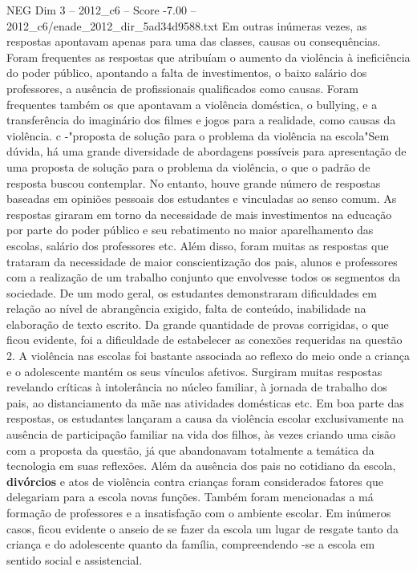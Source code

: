 \begin{textsample}{NEG Dim 3 – 2012\_c6 – Score -7.00 – 2012\_c6/enade\_2012\_dir\_5ad34d9588.txt}
Em outras inúmeras vezes, as respostas apontavam apenas para uma das classes, causas ou consequências.
Foram frequentes as respostas que atribuíam o aumento da violência à ineficiência do poder público, apontando a falta de investimentos, o baixo salário dos professores, a ausência de profissionais qualificados como causas.
Foram frequentes também os que apontavam a violência doméstica, o bullying, e a transferência do imaginário dos filmes e jogos para a realidade, como causas da violência. c -"proposta de solução para o problema da violência na escola"Sem dúvida, há uma grande diversidade de abordagens possíveis para apresentação de uma proposta de solução para o problema da violência, o que o padrão de resposta buscou contemplar.
No entanto, houve grande número de respostas baseadas em opiniões pessoais dos estudantes e vinculadas ao senso comum.
As respostas giraram em torno da necessidade de mais investimentos na educação por parte do poder público e seu rebatimento no maior aparelhamento das escolas, salário dos professores etc.
Além disso, foram muitas as respostas que trataram da necessidade de maior conscientização dos pais, alunos e professores com a realização de um trabalho conjunto que envolvesse todos os segmentos da sociedade.
De um modo geral, os estudantes demonstraram dificuldades em relação ao nível de abrangência exigido, falta de conteúdo, inabilidade na elaboração de texto escrito.
Da grande quantidade de provas corrigidas, o que ficou evidente, foi a dificuldade de estabelecer as conexões requeridas na questão 2.
A violência nas escolas foi bastante associada ao reflexo do meio onde a criança e o adolescente mantém os seus vínculos afetivos.
Surgiram muitas respostas revelando críticas à intolerância no núcleo familiar, à jornada de trabalho dos pais, ao distanciamento da mãe nas atividades domésticas etc.
Em boa parte das respostas, os estudantes lançaram a causa da violência escolar exclusivamente na ausência de participação familiar na vida dos filhos, às vezes criando uma cisão com a proposta da questão, já que abandonavam totalmente a temática da tecnologia em suas reflexões.
Além da ausência dos pais no cotidiano da escola, \textbf{divórcios} e atos de violência contra crianças foram considerados fatores que delegariam para a escola novas funções.
Também foram mencionadas a má formação de professores e a insatisfação com o ambiente escolar.
Em inúmeros casos, ficou evidente o anseio de se fazer da escola um lugar de resgate tanto da criança e do adolescente quanto da família, compreendendo -se a escola em sentido social e assistencial.

\end{textsample}
